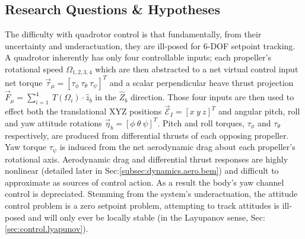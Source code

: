 \subsection{Research Questions \& Hypotheses}
\label{subsec:intro.foreword.hypotheses}
The difficulty with quadrotor control is that fundamentally, from their uncertainty and underactuation, they are ill-posed for 6-DOF setpoint tracking. A quadrotor inherently has only four controllable inputs; each propeller's rotational speed $\Omega_{1,2,3,4}$ which are then abstracted to a net virtual control input net torque $\vec{\tau}_\mu=[\tau_{\phi}~\tau_{\theta}~\tau_{\psi}]^T$ and a scalar perpendicular heave thrust projection $\vec{F}_\mu=\sum_{i=1}^{4}~T(\Omega_i)\cdot\hat{z}_b$ in the $\hat{Z}_b$ direction. Those four inputs are then used to effect both the translational XYZ positions $\vec{\mathcal{E}}_I=[x~y~z]^T$ and angular pitch, roll and yaw attitude rotations $\vec{\eta}_b=[\phi~\theta~\psi]^T$. Pitch and roll torques, $\tau_{\phi}$ and $\tau_{\theta}$ respectively, are produced from differential thrusts of each opposing propeller. Yaw torque $\tau_{\psi}$ is induced from the net aerodynamic drag about each propeller's rotational axis. Aerodynamic drag and differential thrust responses are highly nonlinear (detailed later in Sec:\ref{subsec:dynamics.aero.bem}) and difficult to approximate as sources of control action. As a result the body's yaw channel control is depreciated. Stemming from the system's underactuation, the attitude control problem is a zero setpoint problem, attempting to track attitudes is ill-posed and will only ever be locally stable (in the Layupanov sense, Sec:\ref{sec:control.lyapunov}).
\par
